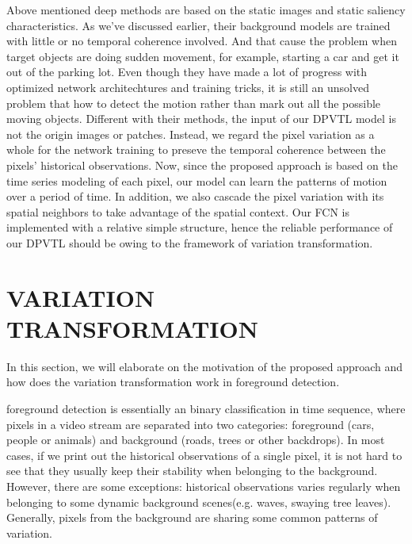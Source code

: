 \documentclass[journal]{IEEEtran}
\begin{document}
Above mentioned deep methods are based on the static images and static saliency characteristics. 
As we've discussed earlier, their background models are trained with little or no temporal coherence involved.
And that cause the problem when target objects are doing sudden movement, for example, starting a car and get it out of the parking lot. 
Even though they have made a lot of progress with optimized network architechtures and training tricks, it is still an unsolved problem that how to detect the motion rather than mark out all the possible moving objects.
Different with their methods, the input of our DPVTL model is not the origin images or patches. Instead, we regard the pixel variation as a whole for the network training to preseve the temporal coherence between the pixels' historical observations.
Now, since the proposed approach is based on the time series modeling of each pixel, our model can learn the patterns of motion over a period of time.
In addition, we also cascade the pixel variation with its spatial neighbors to take advantage of the spatial context. 
Our FCN is implemented with a relative simple structure, hence the reliable performance of our DPVTL should be owing to the framework of variation transformation. 


\section{VARIATION TRANSFORMATION}
\label{sec3}
In this section, we will elaborate on the motivation of the proposed approach and how does the variation transformation work in foreground detection.

foreground detection is essentially an binary classification in time sequence, where pixels in a video stream are separated into two categories: foreground (cars, people or animals) and background (roads, trees or other backdrops). 
In most cases, if we print out the historical observations of a single pixel, it is not hard to see that they usually keep their stability when belonging to the background. 
However, there are some exceptions: historical observations varies regularly when belonging to some dynamic background scenes(e.g. 
waves, swaying tree leaves). 
Generally, pixels from the background are sharing some common patterns of variation. 
\end{document}
